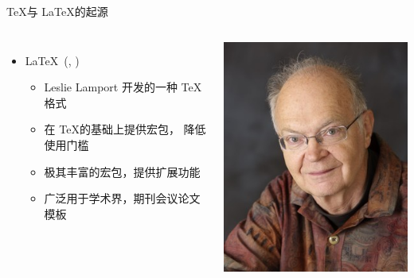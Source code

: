 \begin{frame}[fragile]{\TeX 与 \LaTeX 的起源}
\begin{columns}[T]
\begin{itemize}
        \vspace{2em}
      \item \LaTeX\ (, )
        \begin{itemize}
          \item Leslie Lamport 开发的一种 \TeX 格式
          \item 在 \TeX 的基础上提供宏包， 降低使用门槛
          \item 极其丰富的宏包，提供扩展功能
          \item 广泛用于学术界，期刊会议论文模板
        \end{itemize}
    \end{itemize}
    \includegraphics[width=\textwidth]{Knuth.jpg}


\end{columns}
\end{frame}

